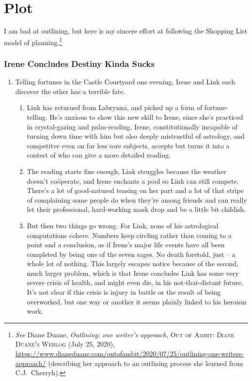\documentclass[../FGP.tex]{subfiles}
\begin{document}
\setmarginpargeometry
\part{Plot}
I am bad at outlining, but here is my sincere effort at following the Shopping List model of planning.\footnote{\textit{See} Diane Duane, \textit{Outlining: one writer’s approach}, \textsc{Out of Ambit: Diane Duane's Weblog} (July 25, 2020), \url{https://www.dianeduane.com/outofambit/2020/07/25/outlining-one-writers-approach/} (describing her approach to an outlining process she learned from C.J.~Cherryh).}
\section{Irene Concludes Destiny Kinda Sucks}
\begin{enumerate}
   \item Telling fortunes in the Castle Courtyard one evening, Irene and Link each discover the other has a terrible fate.
       \begin{enumerate} \item Link has returned from Labrynna, and picked up a form of fortune-telling. He's anxious to show this new skill to Irene, since she's practiced in crystal-gazing and palm-reading. Irene, constitutionally incapable of turning down time with him but also deeply mistrustful of astrology, and competitve even on far less sore subjects, accepts but turns it into a contest of who can give a more detailed reading.
       \item The reading starts fine enough, Link struggles because the weather doesn't coöperate, and Irene enchants a pool so Link can still compete. There's a lot of good-natured teasing on her part and a lot of that stripe of complaining some people do when they're among friends and can really let their professional, hard-working mask drop and be a little bit childish.
       \item But then two things go wrong. For Link, none of his astrological computations cohere. Numbers keep circling rather than coming to a point and a conclusion, as if Irene's major life events have all been completed by being one of the seven sages. No death foretold, just -- a whole lot of nothing. This largely escapes notice because of the second, much larger problem, which is that Irene concludes Link has some very severe crisis of health, and might even die, in his not-that-distant future. It's not clear if this crisis is injury in battle or the result of being overworked, but one way or another it seems plainly linked to his heroism work. 

\end{enumerate}
\end{enumerate}
\end{document}
